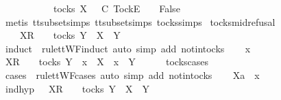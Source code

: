 \isamarkupfalse%
\isanewline
\ \ \isamarkupfalse%
\ {\isasymrho}\ {\isasymsigma}\isanewline
\ \ \isamarkupfalse%
\ {\isachardoublequoteopen}{\isasymrho}\ {\isasymin}\ tocks\ X\ {\isasymLongrightarrow}\ {\isasymrho}\ {\isasymsubseteq}\isactrlsub C\ {\isacharbrackleft}Tock{\isacharbrackright}\isactrlsub E\ {\isacharhash}\ {\isasymsigma}\ {\isasymLongrightarrow}\ False{\isachardoublequoteclose}\isanewline
\ \ \ \ \isamarkupfalse%
\ {\isacharparenleft}metis\ tt{\isacharunderscore}subset{\isachardot}simps{\isacharparenleft}{}{}{\isacharparenright}\ tt{\isacharunderscore}subset{\isachardot}simps{\isacharparenleft}{}{}{\isacharparenright}\ tocks{\isachardot}simps{\isacharparenright}\isanewline
{}\isamarkupfalse%
%
\endisatagproof
{\isafoldproof}%
%
\isadelimproof
\isanewline
%
\endisadelimproof
\isanewline
{}\isamarkupfalse%
\ tocks{\isacharunderscore}mid{\isacharunderscore}refusal{\isacharcolon}\isanewline
\ \ {\isachardoublequoteopen}{\isasymrho}\ {\isacharat}\ {\isacharbrackleft}X{\isacharbrackright}\isactrlsub R\ {\isacharhash}\ {\isasymsigma}\ {\isasymin}\ tocks\ Y\ {\isasymLongrightarrow}\ X\ {\isasymsubseteq}\ Y{\isachardoublequoteclose}\isanewline
%
\isadelimproof
%
\endisadelimproof
%
\isatagproof
{}\isamarkupfalse%
\ {\isacharparenleft}induct\ {\isasymrho}\ rule{\isacharcolon}ttWF{\isachardot}induct{\isacharcomma}\ auto\ simp\ add{\isacharcolon}\ notin{\isacharunderscore}tocks{\isacharparenright}\isanewline
\ \ \isamarkupfalse%
\ x\isanewline
\ \ \isamarkupfalse%
\ {\isachardoublequoteopen}{\isacharbrackleft}X{\isacharbrackright}\isactrlsub R\ {\isacharhash}\ {\isasymsigma}\ {\isasymin}\ tocks\ Y\ {\isasymLongrightarrow}\ x\ {\isasymin}\ X\ {\isasymLongrightarrow}\ x\ {\isasymin}\ Y{\isachardoublequoteclose}\isanewline
\ \ \ \ \isamarkupfalse%
\ tocks{\isachardot}cases\ \isamarkupfalse%
\ {\isacharparenleft}cases\ {\isasymsigma}\ rule{\isacharcolon}ttWF{\isachardot}cases{\isacharcomma}\ auto\ simp\ add{\isacharcolon}\ notin{\isacharunderscore}tocks{\isacharparenright}\isanewline
{}\isamarkupfalse%
\isanewline
\ \ \isamarkupfalse%
\ Xa\ {\isasymsigma}{\isacharprime}\ x\isanewline
\ \ \isamarkupfalse%
\ ind{\isacharunderscore}hyp{\isacharcolon}\ {\isachardoublequoteopen}{\isasymsigma}{\isacharprime}\ {\isacharat}\ {\isacharbrackleft}X{\isacharbrackright}\isactrlsub R\ {\isacharhash}\ {\isasymsigma}\ {\isasymin}\ tocks\ Y\ {\isasymLongrightarrow}\ X\ {\isasymsubseteq}\ Y{\isachardoublequoteclose}\isanewline
